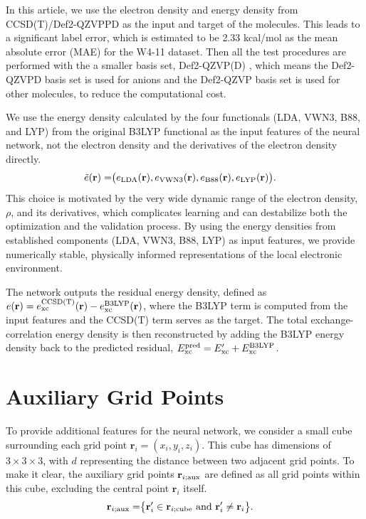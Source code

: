 \documentclass[%
twocolumn,
amsmath,
amssymb,
groupedaddress,
reprint,%
]{revtex4-2}
\newcommand{\brm}[1]{\bm{\mathrm{#1}}}
\begin{document}
In this article, we use the electron density and energy density from CCSD(T)/Def2-QZVPPD \cite{bartlettCoupledclusterTheoryQuantum2007-02-22,weigendBalancedBasisSets2005,zhengMinimallyAugmentedKarlsruhe2011-02} as the input and target of the molecules.
%
This leads to a significant label error, which is estimated to be 2.33 kcal/mol as the mean absolute error (MAE) for the W4-11 dataset.
%
Then all the test procedures are performed with the a smaller basis set, Def2-QZVP(D) \cite{weigendBalancedBasisSets2005,zhengMinimallyAugmentedKarlsruhe2011-02}, which means the Def2-QZVPD basis set is used for anions and the Def2-QZVP basis set is used for other molecules, to reduce the computational cost.

We use the energy density calculated by the four functionals (LDA, VWN3, B88, and LYP) from the original B3LYP functional \cite{perdewAtomsMoleculesSolids1992-09-15} as the input features of the neural network, not the electron density and the derivatives of the electron density directly.
% 
\begin{align}
  \tilde{e}(\brm{r}) =
   & \big( e_{\rm{LDA}}(\brm{r}), e_{\rm{VWN3}}(\brm{r}), e_{\rm{B88}}(\brm{r}), e_{\rm{LYP}}(\brm{r}) \big).
\end{align}
%
This choice is motivated by the very wide dynamic range of the electron density, $\rho$, and its derivatives, which complicates learning and can destabilize both the optimization and the validation process.
%
By using the energy densities from established components (LDA, VWN3, B88, LYP) as input features, we provide numerically stable, physically informed representations of the local electronic environment.

The network outputs the residual energy density, defined as $e(\brm{r}) = e_{\rm{xc}}^{\rm{CCSD(T)}}(\brm{r}) - e_{\rm{xc}}^{\rm{B3LYP}}(\brm{r})$, where the B3LYP term is computed from the input features and the CCSD(T) term serves as the target.
% 
The total exchange-correlation energy density is then reconstructed by adding the B3LYP energy density back to the predicted residual, $E_{\rm{xc}}^{\rm{pred}} = E'_{\rm{xc}} + E_{\rm{xc}}^{\rm{B3LYP}}$.

\section{Auxiliary Grid Points}
To provide additional features for the neural network, we consider a small cube surrounding each grid point $\mathbf{r}_{i} = (x_{i},y_{i},z_{i})$.
% 
This cube has dimensions of $3 \times 3 \times 3$, with $d$ representing the distance between two adjacent grid points.
% 
To make it clear, the auxiliary grid points $\mathbf{r}_{i;\rm{aux}}$ are defined as all grid points within this cube, excluding the central point $\mathbf{r}_{i}$ itself.
\begin{align}
  \mathbf{r}_{i;\rm{aux}} =
   & \big\{ \mathbf{r}'_{i} \in \mathbf{r}_{i;\rm{cube}} \text{ and } \mathbf{r}'_{i} \neq \mathbf{r}_{i} \big\}.
\end{align}
\end{document}
